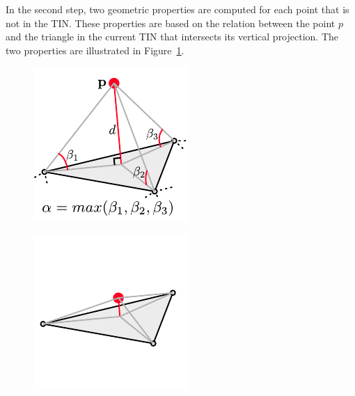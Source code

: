 In the second step, two geometric properties are computed for each point that is not in the TIN\@.
These properties are based on the relation between the point $p$ and the triangle in the current TIN that intersects its vertical projection. 
The two properties are illustrated in Figure~\ref{fig:ground-filtering:symbols}.
\begin{marginfigure}
  \centering
  \begin{subfigure}[b]{0.6\linewidth}
    \centering
    \includegraphics[width=\textwidth]{groundfilter-symbols.pdf}
    \caption{}\label{fig:ground-filtering:symbols}
  \end{subfigure}
  \begin{subfigure}[b]{0.6\linewidth}
    \centering
    \includegraphics[width=\textwidth]{groundfilter-ground.pdf}

\end{subfigure}
\end{marginfigure}
